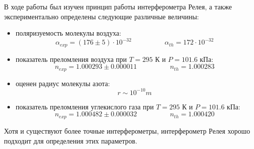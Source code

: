 \documentclass[a4paper,12pt]{article}
\theoremstyle{definition}
\begin{document}
В ходе работы был изучен принцип работы интерферометра Релея, а также экспериментально определены следующие различные величины:
\begin{itemize}
    \item поляризуемость молекулы воздуха:
    $$\alpha_{exp} = (176 \pm 5) \cdot 10^{-32}  \hspace{2cm} \alpha_{th} = 172 \cdot 10^{-32}$$
    \item показатель преломления воздуха при $T = 295$ К и $P = 101.6$ кПа:
    $$n_{exp} = 1.000293 \pm 0.000011 \hspace{2cm} n_{th} = 1.000283$$
    \item оценен радиус молекулы азота:
    $$r \sim 10^{-10} m$$
    \item показатель преломления углекислого газа при $T = 295$ К и $P = 101.6$ кПа:
    $$n_{exp} = 1.000482 \pm 0.000032 \hspace{2cm} n_{th} = 1.000420$$
\end{itemize}

Хотя и существуют более точные интерферометры, интерферометр Релея хорошо подходит для определения этих параметров.
\end{document}
